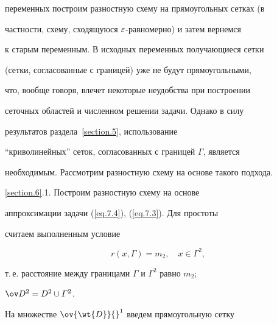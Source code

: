 переменных построим разностную схему на прямоугольных сетках (в


частности, схему, сходящуюся $\varepsilon$-равномерно) и затем вернемся


к старым переменным. В исходных переменных получающиеся сетки


(сетки, согласованные с границей) уже не будут прямоугольными,


что, вообще говоря, влечет некоторые неудобства при построении


сеточных областей и численном решении задачи. Однако в силу


результатов раздела~\ref{section.5}, использование


``криволинейных'' сеток, согласованных с границей $\varGamma$, является


необходимым. Рассмотрим разностную схему на основе такого подхода.


\medskip





\ref{section.6}.1. Построим разностную схему на основе


аппроксимации задачи (\ref{eq.7.4}), (\ref{eq.7.3}). Для простоты


считаем выполненным условие


\begin{equation}\label{eq.6.1^1}


r(x,\varGamma)=m_2,\quad x\in \varGamma^2,


\end{equation}


т.\,е. расстояние между границами $\varGamma$ и $\varGamma^2$ равно $m_2$;


$\od{}^2=D^2\cup\varGamma^2$.


На множестве $\ov{\wt{D}}{}^1$ введем прямоугольную сетку


